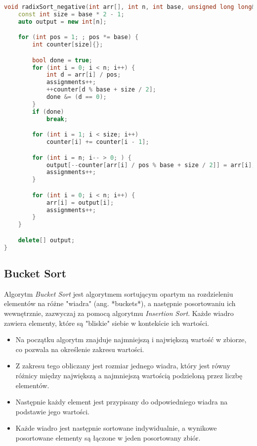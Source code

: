 \documentclass[a4paper,12pt]{article}
\begin{document}
\newpage
\begin{lstlisting}[language=C++,caption=Radix z obsługą ujemnych liczb]
void radixSort_negative(int arr[], int n, int base, unsigned long long& comparisons, unsigned long long& assignments) {
    const int size = base * 2 - 1;
    auto output = new int[n];

    for (int pos = 1; ; pos *= base) {
        int counter[size]{};

        bool done = true;
        for (int i = 0; i < n; i++) {
            int d = arr[i] / pos;
            assignments++;
            ++counter[d % base + size / 2];
            done &= (d == 0);
        }
        if (done)
            break;

        for (int i = 1; i < size; i++)
            counter[i] += counter[i - 1];

        for (int i = n; i-- > 0; ) {
            output[--counter[arr[i] / pos % base + size / 2]] = arr[i];
            assignments++;
        }

        for (int i = 0; i < n; i++) {
            arr[i] = output[i];
            assignments++;
        }
    }

    delete[] output;
}

\end{lstlisting}
\newpage

\subsection{Bucket Sort}
Algorytm \textit{Bucket Sort} jest algorytmem sortującym opartym na rozdzieleniu elementów na różne "wiadra" (ang. *buckets*), a następnie posortowaniu ich wewnętrznie, zazwyczaj za pomocą algorytmu \textit{Insertion Sort}. Każde wiadro zawiera elementy, które są "bliskie" siebie w kontekście ich wartości.

\begin{itemize}
    \item Na początku algorytm znajduje najmniejszą i największą wartość w zbiorze, co pozwala na określenie zakresu wartości.
    \item Z zakresu tego obliczany jest rozmiar jednego wiadra, który jest równy różnicy między największą a najmniejszą wartością podzieloną przez liczbę elementów.
    \item Następnie każdy element jest przypisany do odpowiedniego wiadra na podstawie jego wartości.
    \item Każde wiadro jest następnie sortowane indywidualnie, a wynikowe posortowane elementy są łączone w jeden posortowany zbiór.
\end{itemize}
\end{document}
